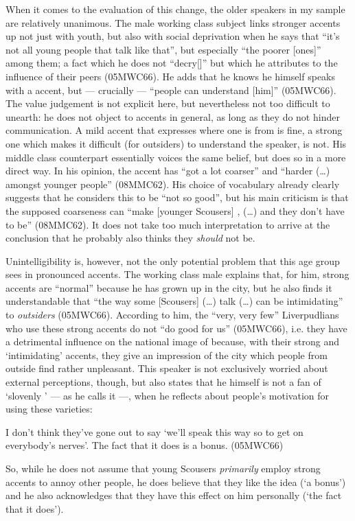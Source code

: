 When it comes to the evaluation of this change, the older speakers in my sample are relatively unanimous.
The male working class subject links stronger accents up not just with youth, but also with social deprivation when he says that ``it's not all young people that talk like that'', but especially ``the poorer [ones]'' among them; a fact which he does not ``decry[]'' but which he attributes to the influence of their peers (05MWC66).
He adds that he knows he himself speaks with a  accent, but --- crucially --- ``people can understand [him]'' (05MWC66).
The value judgement is not explicit here, but nevertheless not too difficult to unearth: he does not object to  accents in general, as long as they do not hinder communication.
A mild accent that expresses where one is from is fine, a strong one which makes it difficult (for outsiders) to understand the speaker, is not.
His middle class counterpart essentially voices the same belief, but does so in a more direct way.
In his opinion, the accent has ``got a lot coarser'' and ``harder (\ldots) amongst younger people'' (08MMC62).
His choice of vocabulary already clearly suggests that he considers this to be ``not so good'', but his main criticism is that the supposed coarseness can ``make [younger Scousers] , (\ldots) and they don't have to be'' (08MMC62).
It does not take too much interpretation to arrive at the conclusion that he probably also thinks they \emph{should} not be.

Unintelligibility is, however, not the only potential problem that this age group sees in pronounced  accents.
The working class male explains that, for him, strong  accents are ``normal'' because he has grown up in the city, but he also finds it understandable that ``the way some [Scousers] (\ldots) talk (\ldots) can be intimidating'' to \emph{outsiders} (05MWC66).
According to him, the ``very, very few'' Liverpudlians who use these strong accents do not ``do good for us'' (05MWC66), i.e. they have a detrimental influence on the national image of  because, with their strong and `intimidating' accents, they give an impression of the city which people from outside find rather unpleasant.
This speaker is not exclusively worried about external perceptions, though, but also states that he himself is not a fan of `slovenly ' --- as he calls it ---, when he reflects about people's motivation for using these varieties: 
\begin{example}
	I don't think they've  gone out to say `we'll speak this way so to get on everybody's nerves'. The fact that it does is a bonus. (05MWC66)
\end{example}
So, while he does not assume that young Scousers \emph{primarily} employ strong accents to annoy other people, he does believe that they like the idea (`a bonus') and he also acknowledges that they have this effect on him personally (`the fact that it does').

